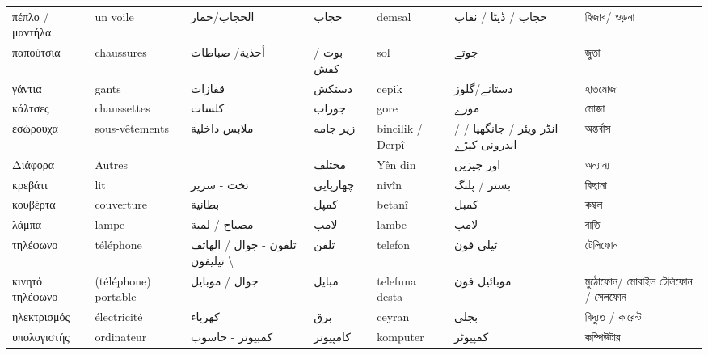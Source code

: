 \begin{longtable}{p{3.5cm} p{3.5cm} p{3.5cm} p{3.5cm} p{3.5cm} p{3.5cm} p{3.5cm} }
 πέπλο / μαντήλα & un voile        & الحجاب/خمار             & حجاب      & demsal           & حجاب / ڈپٹا / نقاب                  & হিজাব/ ওড়না  \\
 παπούτσια       & chaussures      & أحذية/ صباطات           & بوت / کفش & sol              & جوتے                                & জুতা         \\
 γάντια          & gants           & قفازات                  & دستکش     & cepik            & دستانے/گلوز                         & হাতমোজা      \\
 κάλτσες         & chaussettes     & كلسات                   & جوراب     & gore             & موزے                                & মোজা         \\
 εσώρουχα        & sous-vêtements  & ملابس داخلية            & زیر جامه  & bincilik / Derpî & انڈر ویئر / جانگھیا / /اندرونی کپڑے & অন্তর্বাস    \\
\midrule
 Διάφορα             & Autres                      &                                 & مختلف      & Yên din            & اور چیزیں            & অন্যান্য                         \\
\midrule
 κρεβάτι             & lit                         & تخت - سرير                      & چهارپایی   & nivîn              & بستر / پلنگ          & বিছানা                           \\
 κουβέρτα            & couverture                  & بطانية                          & کمپل       & betanî             & کمبل                 & কম্বল                            \\
 λάμπα               & lampe                       & مصباح / لمبة                    & لامپ       & lambe              & لامپ                 & বাতি                             \\
 τηλέφωνο            & téléphone                   & تلفون - جوال / الهاتف \textbackslash{} تيليفون & تلفن       & telefon            & ٹیلی فون             & টেলিফোন                          \\
 κινητό τηλέφωνο     & (téléphone) portable        & جوال / موبايل                   & مبایل      & telefuna desta     & موبائیل فون          & মুঠোফোন/ মোবাইল টেলিফোন / সেলফোন \\
 ηλεκτρισμός         & électricité                 & كهرباء                          & برق        & ceyran             & بجلی                 & বিদ্যুত / কারেন্ট                \\
 υπολογιστής         & ordinateur                  & كمبيوتر - حاسوب                 & کامپیوتر   & komputer           & کمپیوٹر              & কম্পিউটার                        \\

\end{longtable}
